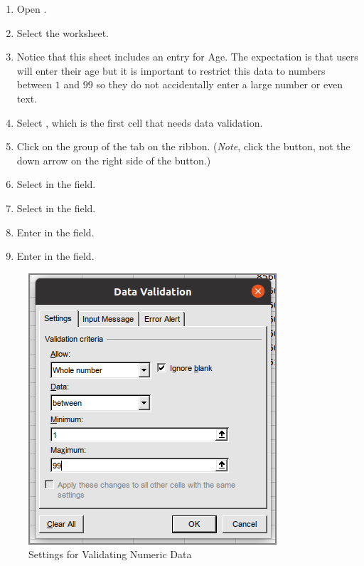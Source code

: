 \begin{enumerate}
	\item Open .
	\item Select the  worksheet.
	\item Notice that this sheet includes an entry for Age. The expectation is that users will enter their age but it is important to restrict this data to numbers between $ 1 $ and $ 99 $ so they do not accidentally enter a large number or even text.
	\item Select , which is the first cell that needs data validation. 
	\item Click  on the  group of the  tab on the ribbon. (\textit{Note}, click the button, not the down arrow on the right side of the button.)
	\item Select  in the  field.
	\item Select  in the  field.
	\item Enter  in the  field.
	\item Enter  in the  field.
\end{enumerate}

\begin{figure}[H]
	\centering
	\includegraphics[width=\maxwidth{.95\linewidth}]{gfx/ch07_fig39}
	\caption{Settings for Validating Numeric Data}
	\label{07:fig39}
\end{figure}


